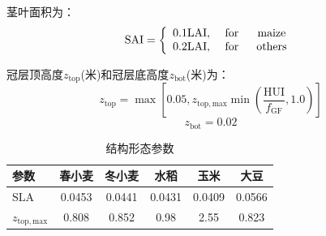茎叶面积为：
\begin{equation}
  {\rm SAI}=\left\{\begin{array}{lcc}0.1 {\rm LAI}, & \text { for } & \text { maize } \\
  0.2 {\rm LAI}, & \text { for } & \text {others}\end{array}\right.
\end{equation}

冠层顶高度$z_{\mathrm{top}}$(米)和冠层底高度$z_{\mathrm{bot}}$(米)为：
\begin{equation}
  z_{\mathrm{top}}=\max \left[0.05, z_{\mathrm{top,max}} \min \left(\frac{{\mathrm {HUI}}}{f_{\mathrm{GF}}}, 1.0\right)\right]
\end{equation}
\begin{equation}
  z_{\mathrm{b o t}}=0.02
\end{equation}

\begin{table}[htbp]
  \centering
  \caption{结构形态参数}
  \label{tab:结构形态参数}
  \begin{tabular}{@{}lccccc}
    \toprule
    参数                   & 春小麦 & 冬小麦 & 水稻   & 玉米   & 大豆   \\ \midrule
    ${\mathrm {SLA}}$      & 0.0453 & 0.0441 & 0.0431 & 0.0409 & 0.0566 \\
    $z_{\mathrm{top,max}}$ & 0.808  & 0.852  & 0.98   & 2.55   & 0.823  \\ \bottomrule
  \end{tabular}
\end{table}
